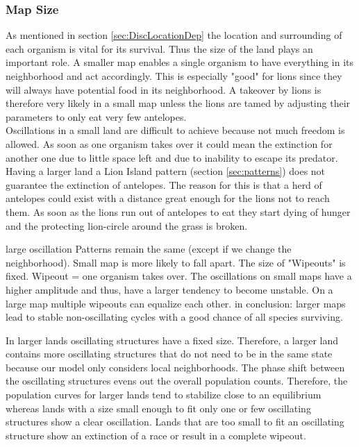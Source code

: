 \documentclass[11pt]{article}
\begin{document}
\subsubsection{Map Size} %
\label{sec:DiscMapSize}
As mentioned in section \ref{sec:DiscLocationDep} the location and surrounding of each organism is vital for its survival. Thus the size of the land plays an important role. A smaller map enables a single organism to have everything in its neighborhood and act accordingly. This is especially "good" for lions since they will always have potential food in its neighborhood. A takeover by lions is therefore very likely in a small map unless the lions are tamed by adjusting their parameters to only eat very few antelopes.\\
Oscillations in a small land are difficult to achieve because not much freedom is allowed. As soon as one organism takes over it could mean the extinction for another one due to little space left and due to inability to escape its predator.\\
Having a larger land a Lion Island pattern (section \ref{sec:patterns}) does not guarantee the extinction of antelopes. The reason for this is that a herd of antelopes could exist with a distance great enough for the lions not to reach them. As soon as the lions run out of antelopes to eat they start dying of hunger and the protecting lion-circle around the grass is broken.

large oscillation 
Patterns remain the same (except if we change the neighborhood). Small map is more likely to fall apart. The size of "Wipeouts" is fixed. Wipeout = one organism takes over. The oscillations on small maps have a higher amplitude and thus, have a larger tendency to become unstable. On a large map multiple wipeouts can equalize each other.
in conclusion: larger maps lead to stable non-oscillating cycles with a good chance of all species surviving. 

In larger lands oscillating structures have a fixed size. Therefore, a larger land contains more oscillating structures that do not need to be in the same state because our model only considers local neighborhoods. The phase shift between the oscillating structures evens out the overall population counts. Therefore, the population curves for larger lands tend to stabilize close to an equilibrium whereas lands with a size small enough to fit only one or few oscillating structures show a clear oscillation. Lands that are too small to fit an oscillating structure show an extinction of a race or result in a complete wipeout.\\
\end{document}
